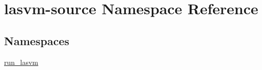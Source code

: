 \hypertarget{namespacelasvm-source}{\section{lasvm-\/source Namespace Reference}
\label{namespacelasvm-source}
}
\subsection*{Namespaces}
\begin{DoxyCompactItemize}
\item 
 \hyperlink{namespacelasvm-source_1_1run__lasvm}{run\+\_\+lasvm}
\end{DoxyCompactItemize}
